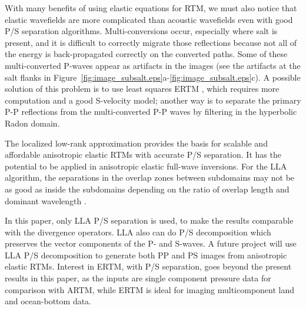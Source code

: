 \documentclass[manuscript,ulem,graphix,revised]{geophysics}
\begin{document}

With many benefits of using elastic equations for RTM, we must also notice that elastic wavefields are more complicated than acoustic wavefields even with good P/S separation algorithms. Multi-conversions occur, especially where salt is present, and it is difficult to correctly migrate those reflections because not all of the energy is back-propagated correctly on the converted paths. Some of these multi-converted P-waves appear as artifacts in the images (see the artifacts at the salt flanks in Figure~\ref{fig:image_subsalt.eps}a-\ref{fig:image_subsalt.eps}c). 
A possible solution of this problem is to use least squares ERTM \citep{duan16}, which requires more computation and a good S-velocity model; 
another way is to separate the primary P-P reflections from the multi-converted P-P waves by filtering in the hyperbolic Radon domain.

The localized low-rank approximation provides the basis for scalable and affordable anisotropic elastic RTMs with accurate P/S separation. It has the potential to be applied in anisotropic elastic full-wave inversions. For the LLA algorithm, the separations in the overlap zones between subdomains may not be as good as inside the subdomains depending on the ratio of overlap length and dominant wavelength \citep{wenlong18}. 

In this paper, only LLA P/S separation is used, to make the results comparable with the divergence operators. LLA also can do P/S decomposition which preserves the vector components of the P- and S-waves. A future project will use LLA P/S decomposition to generate both PP and PS images from anisotropic elastic RTMs. Interest in ERTM, with P/S separation, goes beyond the present results in this paper, as the inputs are single component pressure data for comparison with ARTM, while ERTM is ideal for imaging multicomponent land and ocean-bottom data.
\end{document}
